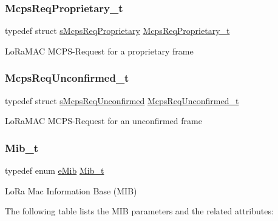 \subsubsection{\texorpdfstring{Mcps\+Req\+Proprietary\+\_\+t}{McpsReqProprietary\_t}}
{\footnotesize\ttfamily typedef struct \mbox{\hyperlink{structs_mcps_req_proprietary}{s\+Mcps\+Req\+Proprietary}} \mbox{\hyperlink{group___l_o_r_a_m_a_c_gac856bc282e89301412e0a294b3e663c4}{Mcps\+Req\+Proprietary\+\_\+t}}}

Lo\+Ra\+M\+AC M\+C\+P\+S-\/\+Request for a proprietary frame \mbox{\label{group___l_o_r_a_m_a_c_gaab871b914dfa4013c176586dcc2ea6df}} 
\subsubsection{\texorpdfstring{Mcps\+Req\+Unconfirmed\+\_\+t}{McpsReqUnconfirmed\_t}}
{\footnotesize\ttfamily typedef struct \mbox{\hyperlink{structs_mcps_req_unconfirmed}{s\+Mcps\+Req\+Unconfirmed}} \mbox{\hyperlink{group___l_o_r_a_m_a_c_gaab871b914dfa4013c176586dcc2ea6df}{Mcps\+Req\+Unconfirmed\+\_\+t}}}

Lo\+Ra\+M\+AC M\+C\+P\+S-\/\+Request for an unconfirmed frame \mbox{\label{group___l_o_r_a_m_a_c_gaf17bd3de9ec75e4954be9a070cd8ddf9}} 
\subsubsection{\texorpdfstring{Mib\+\_\+t}{Mib\_t}}
{\footnotesize\ttfamily typedef enum \mbox{\hyperlink{group___l_o_r_a_m_a_c_ga32ea83d13a3f5bb4b3ec2ace2319ab61}{e\+Mib}} \mbox{\hyperlink{group___l_o_r_a_m_a_c_gaf17bd3de9ec75e4954be9a070cd8ddf9}{Mib\+\_\+t}}}

Lo\+Ra Mac Information Base (M\+IB)

The following table lists the M\+IB parameters and the related attributes\+:

